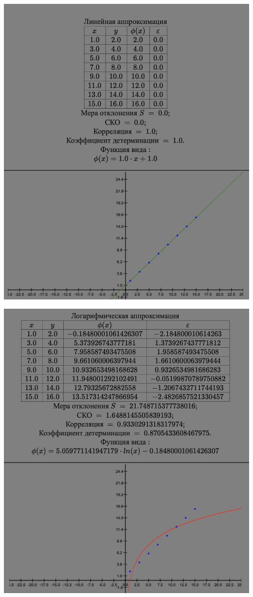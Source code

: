 \documentclass{article}
\begin{document}
\begin{center}
    \includegraphics[width=.7\textwidth]{lin.png}
\end{center}
\begin{center}
    \includegraphics[width=.7\textwidth]{log.png}
\end{center}
\end{document}
